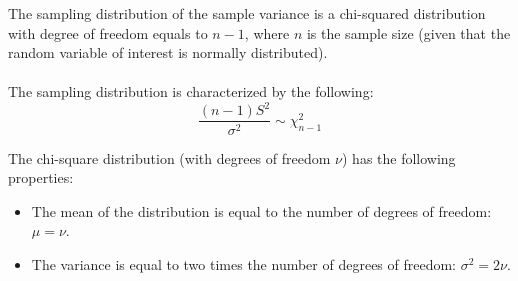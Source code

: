 \begin{framed}
\large 
\noindent The sampling distribution of the sample variance is a chi-squared distribution with degree of freedom equals to $n-1$, where $n$ is the sample size (given that the random variable of interest is normally distributed).
\\
\\
\noindent The sampling distribution is characterized by the following:
\[ \frac{(n-1)S^2}{\sigma^2}  \sim \chi^{2}_{n-1}\]

\end{framed}

	
	
	

\begin{framed}
\large
\noindent The chi-square distribution (with degrees of freedom $\nu$) has the following properties:

\begin{itemize}
    \item The mean of the distribution is equal to the number of degrees of freedom: $\mu = \nu$. 
    \item The variance is equal to two times the number of degrees of freedom: $\sigma^2 = 2\nu$.
\end{itemize}
\end{framed}


